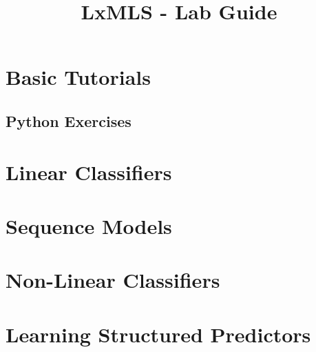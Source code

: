 \documentclass{report}
\begin{document}
\title{LxMLS - Lab Guide}

\maketitle

\renewcommand{\chaptername}{Day}
\setcounter{chapter}{-1}

\chapter{Basic Tutorials}


%

\section{Python Exercises}


\chapter{\label{day:classification}Linear Classifiers}


\chapter{\label{day:seq}Sequence Models}


\chapter{Non-Linear Classifiers}


\chapter{\label{day:seq_disc}Learning Structured Predictors}

\end{document}
